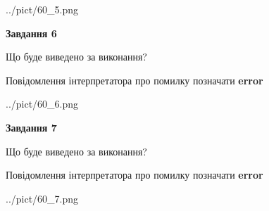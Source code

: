 \documentclass[10pt, ukrainian]{article}
\begin{document}
{\begin {large}
\begin{center}
	{../pict/60_5.png}
\end{center}
\newpage

{\begin {center}\textbf{Завдання 6}\end {center}}\par
Що буде виведено за виконання? \par
Повідомлення інтерпретатора про помилку позначати \textbf{error}

\begin{center}
	{../pict/60_6.png}
\end{center}
\newpage

{\begin {center}\textbf{Завдання 7}\end {center}}\par
Що буде виведено за виконання? \par
Повідомлення інтерпретатора про помилку позначати \textbf{error}

\begin{center}
	{../pict/60_7.png}
\end{center}
\newpage

\end {large}}
\end{document}
